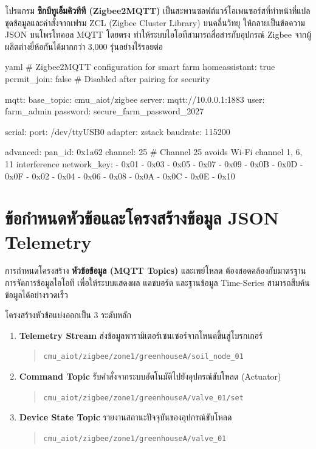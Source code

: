 โปรแกรม \textbf{ซิกบีทูเอ็มคิวทีที (Zigbee2MQTT)} เป็นสะพานซอฟต์แวร์โอเพนซอร์สที่ทำหน้าที่แปลชุดข้อมูลและคำสั่งจากเฟรม ZCL (Zigbee Cluster Library) บนคลื่นวิทยุ ให้กลายเป็นข้อความ JSON บนโพรโทคอล MQTT โดยตรง ทำให้ระบบไอโอทีสามารถสื่อสารกับอุปกรณ์ Zigbee จากผู้ผลิตต่างยี่ห้อกันได้มากกว่า 3,000 รุ่นอย่างไร้รอยต่อ

\begin{codebox}{yaml}
# Zigbee2MQTT configuration for smart farm
homeassistant: true
permit_join: false # Disabled after pairing for security

mqtt:
  base_topic: cmu_aiot/zigbee
  server: mqtt://10.0.0.1:1883
  user: farm_admin
  password: secure_farm_password_2027

serial:
  port: /dev/ttyUSB0
  adapter: zstack
  baudrate: 115200

advanced:
  pan_id: 0x1a62
  channel: 25 # Channel 25 avoids Wi-Fi channel 1, 6, 11 interference
  network_key:
    - 0x01
    - 0x03
    - 0x05
    - 0x07
    - 0x09
    - 0x0B
    - 0x0D
    - 0x0F
    - 0x02
    - 0x04
    - 0x06
    - 0x08
    - 0x0A
    - 0x0C
    - 0x0E
    - 0x10
\end{codebox}

\section{ข้อกำหนดหัวข้อและโครงสร้างข้อมูล JSON Telemetry}

การกำหนดโครงสร้าง \textbf{หัวข้อข้อมูล (MQTT Topics)} และเพย์โหลด ต้องสอดคล้องกับมาตรฐานการจัดการข้อมูลไอโอที เพื่อให้ระบบแสดงผล แดชบอร์ด และฐานข้อมูล Time-Series สามารถสืบค้นข้อมูลได้อย่างรวดเร็ว

\begin{protocolbox}
โครงสร้างหัวข้อแบ่งออกเป็น 3 ระดับหลัก
\begin{enumerate}
    \item \textbf{Telemetry Stream} ส่งข้อมูลพารามิเตอร์เซนเซอร์จากโหนดขึ้นสู่โบรกเกอร์
    \begin{quote}
        \texttt{cmu\_aiot/zigbee/zone1/greenhouseA/soil\_node\_01}
    \end{quote}
    \item \textbf{Command Topic} รับคำสั่งจากระบบอัตโนมัติไปยังอุปกรณ์ขับโหลด (Actuator)
    \begin{quote}
        \texttt{cmu\_aiot/zigbee/zone1/greenhouseA/valve\_01/set}
    \end{quote}
    \item \textbf{Device State Topic} รายงานสถานะปัจจุบันของอุปกรณ์ขับโหลด
    \begin{quote}
        \texttt{cmu\_aiot/zigbee/zone1/greenhouseA/valve\_01}
    \end{quote}
\end{enumerate}
\end{protocolbox}

